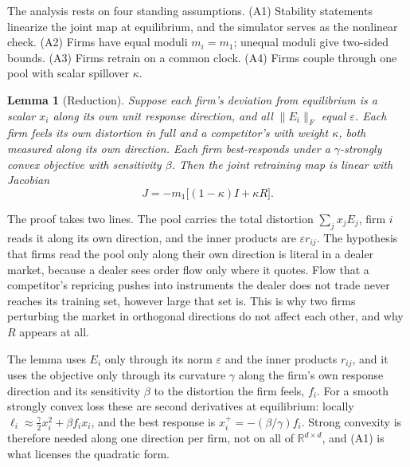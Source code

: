 \documentclass[conference]{IEEEtran}
\newtheorem{lemma}{Lemma}
\theoremstyle{definition}
\begin{document}
The analysis rests on four standing assumptions. (A1) Stability statements
linearize the joint map at equilibrium, and the simulator serves as the
nonlinear check. (A2) Firms have equal moduli $m_i = m_1$; unequal moduli give
two-sided bounds. (A3) Firms retrain on a common clock. (A4) Firms couple
through one pool with scalar spillover $\kappa$.

\begin{lemma}[Reduction]\label{lem:reduction}
Suppose each firm's deviation from equilibrium is a scalar $x_i$ along its own
unit response direction, and all $\|E_i\|_F$ equal $\varepsilon$. Each firm
feels its own distortion in full and a competitor's with weight $\kappa$, both
measured along its own direction. Each firm best-responds under a
$\gamma$-strongly convex objective with sensitivity $\beta$. Then the joint
retraining map is linear with Jacobian
\begin{equation}
  J = -m_1\bigl[(1-\kappa)I + \kappa R\bigr].
  \label{eq:jac}
\end{equation}
\end{lemma}

The proof takes two lines. The pool carries the total distortion
$\sum_j x_j E_j$, firm $i$ reads it along its own direction, and the inner
products are $\varepsilon r_{ij}$. The hypothesis that firms read the pool
only along their own direction is literal in a dealer market, because a dealer
sees order flow only where it quotes. Flow that a competitor's repricing
pushes into instruments the dealer does not trade never reaches its training
set, however large that set is. This is why two firms perturbing the market in
orthogonal directions do not affect each other, and why $R$ appears at all.

The lemma uses $E_i$ only through its norm $\varepsilon$ and the inner
products $r_{ij}$, and it uses the objective only through its curvature
$\gamma$ along the firm's own response direction and its sensitivity $\beta$
to the distortion the firm feels, $f_i$. For a smooth strongly convex loss
these are second derivatives at equilibrium: locally
$\ell_i \approx \tfrac{\gamma}{2}x_i^2 + \beta f_i x_i$, and the best response
is $x_i^{+} = -(\beta/\gamma) f_i$. Strong convexity \cite{perdomo2020} is
therefore needed along one direction per firm, not on all of
$\mathbb{R}^{d\times d}$, and (A1) is what licenses the quadratic form.
\end{document}
